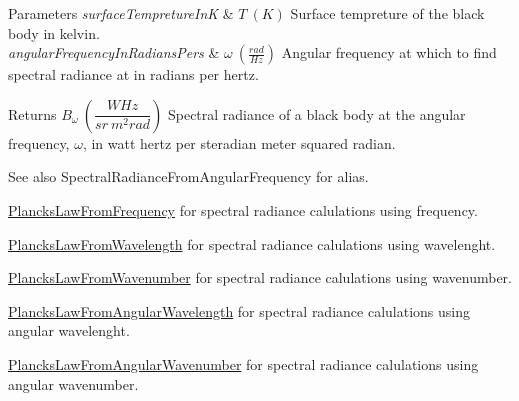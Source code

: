 \begin{DoxyParams}{Parameters}
{\em surface\+Tempreture\+InK} & $T\ (K)$ Surface tempreture of the black body in kelvin. \\
\hline
{\em angular\+Frequency\+In\+Radians\+Pers} & $\omega\ (\frac{rad}{Hz})$ Angular frequency at which to find spectral radiance at in radians per hertz. \\
\hline
\end{DoxyParams}
\begin{DoxyReturn}{Returns}
$B_{\omega}\ ( \dfrac{W Hz}{sr\ m^2 rad})$ Spectral radiance of a black body at the angular frequency, $\omega$, in watt hertz per steradian meter squared radian. 
\end{DoxyReturn}
\begin{DoxySeeAlso}{See also}
Spectral\+Radiance\+From\+Angular\+Frequency for alias. 

\mbox{\hyperlink{group___e_g_x_phys-_electrodynamics-_black_body-_plancks_law_ga68aae82f8a086831358c4a61c8c80ba4}{Plancks\+Law\+From\+Frequency}} for spectral radiance calulations using frequency. 

\mbox{\hyperlink{group___e_g_x_phys-_electrodynamics-_black_body-_plancks_law_ga54639bc031ded51ef78aa82b0457a4dd}{Plancks\+Law\+From\+Wavelength}} for spectral radiance calulations using wavelenght. 

\mbox{\hyperlink{group___e_g_x_phys-_electrodynamics-_black_body-_plancks_law_ga6648ae2a0fbff6735c1e1a04c7cac746}{Plancks\+Law\+From\+Wavenumber}} for spectral radiance calulations using wavenumber. 

\mbox{\hyperlink{group___e_g_x_phys-_electrodynamics-_black_body-_plancks_law_ga7322124727f968d28807e918c5eeb23f}{Plancks\+Law\+From\+Angular\+Wavelength}} for spectral radiance calulations using angular wavelenght. 

\mbox{\hyperlink{group___e_g_x_phys-_electrodynamics-_black_body-_plancks_law_gaa3d3e0fdb77d25bdd40523f9975de902}{Plancks\+Law\+From\+Angular\+Wavenumber}} for spectral radiance calulations using angular wavenumber. 
\end{DoxySeeAlso}
\mbox{\label{group___e_g_x_phys-_electrodynamics-_black_body-_plancks_law_ga7322124727f968d28807e918c5eeb23f}} 
